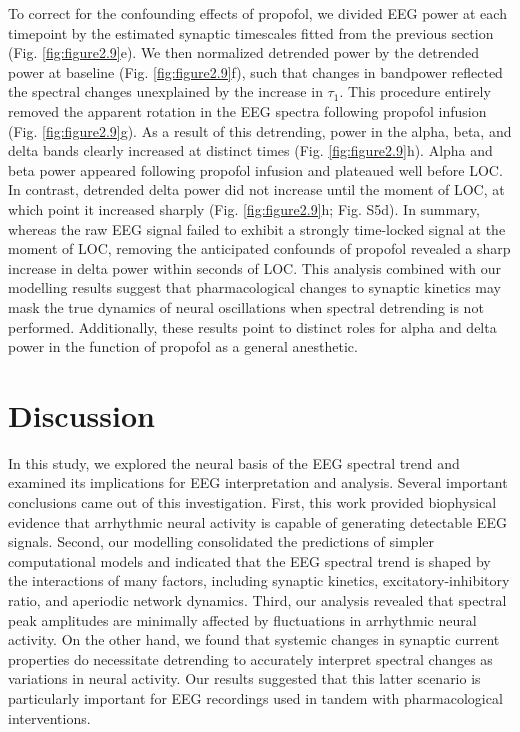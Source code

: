 To correct for the confounding effects of propofol, we divided EEG power at each timepoint by the estimated synaptic timescales fitted from the previous section (Fig. \ref{fig:figure2.9}e). We then normalized detrended power by the detrended power at baseline (Fig. \ref{fig:figure2.9}f), such that changes in bandpower reflected the spectral changes unexplained by the increase in $\tau_1$. This procedure entirely removed the apparent rotation in the EEG spectra following propofol infusion (Fig. \ref{fig:figure2.9}g). As a result of this detrending, power in the alpha, beta, and delta bands clearly increased at distinct times (Fig. \ref{fig:figure2.9}h). Alpha and beta power appeared following propofol infusion and plateaued well before LOC. In contrast, detrended delta power did not increase until the moment of LOC, at which point it increased sharply (Fig. \ref{fig:figure2.9}h; Fig. S5d). In summary, whereas the raw EEG signal failed to exhibit a strongly time-locked signal at the moment of LOC, removing the anticipated confounds of propofol revealed a sharp increase in delta power within seconds of LOC. This analysis combined with our modelling results suggest that pharmacological changes to synaptic kinetics may mask the true dynamics of neural oscillations when spectral detrending is not performed. Additionally, these results point to distinct roles for alpha and delta power in the function of propofol as a general anesthetic. 

\section{Discussion}
In this study, we explored the neural basis of the EEG spectral trend and examined its implications for EEG interpretation and analysis. Several important conclusions came out of this investigation. First, this work provided biophysical evidence that arrhythmic neural activity is capable of generating detectable EEG signals. Second, our modelling consolidated the predictions of simpler computational models \cite{Gao2017, Chaudhuri2018} and indicated that the EEG spectral trend is shaped by the interactions of many factors, including synaptic kinetics, excitatory-inhibitory ratio, and aperiodic network dynamics. Third, our analysis revealed that spectral peak amplitudes are minimally affected by fluctuations in arrhythmic neural activity. On the other hand, we found that systemic changes in synaptic current properties do necessitate detrending to accurately interpret spectral changes as variations in neural activity. Our results suggested that this latter scenario is particularly important for EEG recordings used in tandem with pharmacological interventions. 

